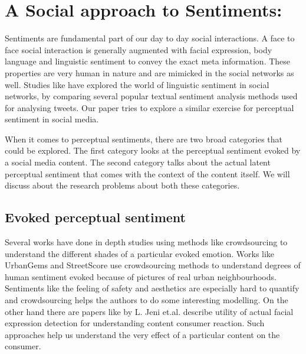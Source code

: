 \section{ A Social approach to Sentiments: }
Sentiments are fundamental part of our day to day social interactions. A face to face social interaction is generally augmented with facial expression, body language and linguistic sentiment to convey the exact meta information. These properties are very human in nature and are mimicked in the social networks as well. Studies like \cite{Joo2014b} have explored the world of linguistic sentiment in social networks, by comparing several popular textual sentiment analysis methods used for analysing tweets. Our paper tries to explore a similar exercise for perceptual sentiment in social media. 
\par
When it comes to perceptual sentiments, there are two broad categories that could be explored. The first category looks at the perceptual sentiment evoked by a social media content. The second category talks about the actual latent perceptual sentiment that comes with the context of the content itself. We will discuss about the research problems about both these categories.

\subsection{ Evoked perceptual sentiment }
Several works have done in depth studies using methods like crowdsourcing to understand the different shades of a particular evoked emotion. Works like UrbanGems \cite{urbanGems} and StreetScore \cite{nikhil} use crowdsourcing methods to understand degrees of human sentiment evoked because of pictures of real urban neighbourhoods. Sentiments like the feeling of safety and aesthetics are especially hard to quantify and crowdsourcing helps the authors to do some interesting modelling. On the other hand there are papers like \cite{jeni20123d} by L. Jeni et.al. describe utility of actual facial expression detection for understanding content consumer reaction. Such approaches help us understand the very effect of a particular content on the consumer. 


